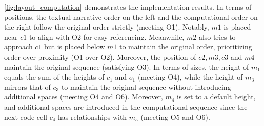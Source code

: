 \autoref{fig:layout_computation} demonstrates the implementation results.
In terms of positions, the textual narrative order on the left and the computational order on the right follow the original order strictly (meeting O1).
Notably,  $m1$ is placed near $c1$ to align with O2 for easy referencing.
Meanwhile, $m2$ also tries to approach $c1$ but is placed below $m1$ to maintain the original order, prioritizing order over proximity (O1 over O2).
Moreover, the position of $c2, m3, c3$ and $m4$ maintain the original sequence (satisfying O3).
In terms of sizes, the height of $m_1$ equals the sum of the heights of $c_1$ and $o_1$ (meeting O4), while the height of $m_3$ mirrors that of $c_3$ to maintain the original sequence without introducing additional spaces (meeting O4 and O6). Moreover, $m_4$ is set to a default height, and additional spaces are introduced in the computational sequence since the next code cell $c_4$ has relationships with $m_5$ (meeting O5 and O6). 


                


